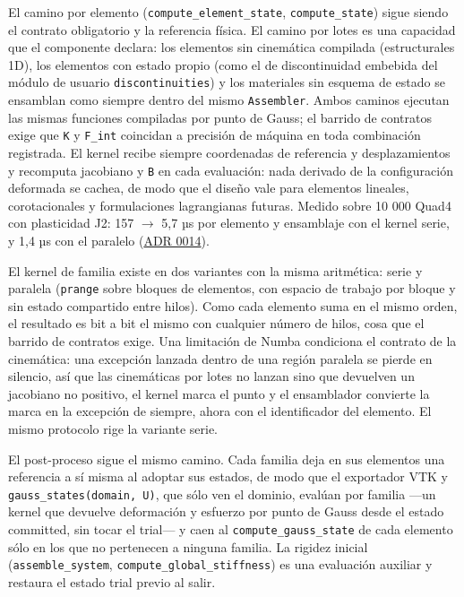 \documentclass[11pt,oneside]{report}
\begin{document}
El camino por elemento (\texttt{compute\_\allowbreak{}element\_\allowbreak{}state}, \texttt{compute\_state}) sigue siendo el contrato obligatorio y la referencia física. El camino por lotes es una capacidad que el componente declara: los elementos sin cinemática compilada (estructurales 1D), los elementos con estado propio (como el de discontinuidad embebida del módulo de usuario \texttt{discontinuities}) y los materiales sin esquema de estado se ensamblan como siempre dentro del mismo \texttt{Assembler}. Ambos caminos ejecutan las mismas funciones compiladas por punto de Gauss; el barrido de contratos exige que \texttt{K} y \texttt{F\_int} coincidan a precisión de máquina en toda combinación registrada. El kernel recibe siempre coordenadas de referencia y desplazamientos y recomputa jacobiano y \texttt{B} en cada evaluación: nada derivado de la configuración deformada se cachea, de modo que el diseño vale para elementos lineales, corotacionales y formulaciones lagrangianas futuras. Medido sobre 10 000 Quad4 con plasticidad J2: 157 \ensuremath{\to} 5,7 µs por elemento y ensamblaje con el kernel serie, y 1,4 µs con el paralelo (\hyperref[adr:0014]{ADR 0014}).

El kernel de familia existe en dos variantes con la misma aritmética: serie y paralela (\texttt{prange} sobre bloques de elementos, con espacio de trabajo por bloque y sin estado compartido entre hilos). Como cada elemento suma en el mismo orden, el resultado es bit a bit el mismo con cualquier número de hilos, cosa que el barrido de contratos exige. Una limitación de Numba condiciona el contrato de la cinemática: una excepción lanzada dentro de una región paralela se pierde en silencio, así que las cinemáticas por lotes no lanzan sino que devuelven un jacobiano no positivo, el kernel marca el punto y el ensamblador convierte la marca en la excepción de siempre, ahora con el identificador del elemento. El mismo protocolo rige la variante serie.

El post-proceso sigue el mismo camino. Cada familia deja en sus elementos una referencia a sí misma al adoptar sus estados, de modo que el exportador VTK y \texttt{gauss\_\allowbreak{}states(domain, U)}, que sólo ven el dominio, evalúan por familia ---un kernel que devuelve deformación y esfuerzo por punto de Gauss desde el estado committed, sin tocar el trial--- y caen al \texttt{compute\_\allowbreak{}gauss\_\allowbreak{}state} de cada elemento sólo en los que no pertenecen a ninguna familia. La rigidez inicial (\texttt{assemble\_system}, \texttt{compute\_\allowbreak{}global\_\allowbreak{}stiffness}) es una evaluación auxiliar y restaura el estado trial previo al salir.
\end{document}
